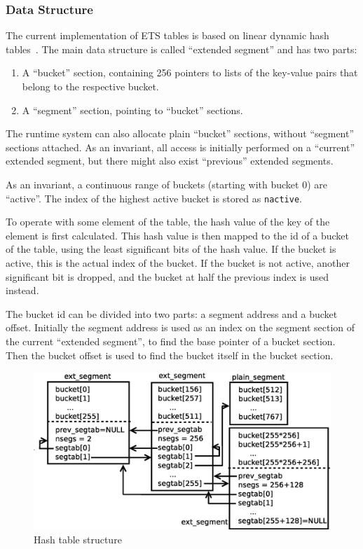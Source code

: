 \documentclass[aps,pre,preprint,nofootinbib]{revtex4}
\begin{document}
\subsubsection{Data Structure}

The current implementation of ETS tables is based on linear dynamic hash tables~\cite{Larson}.
The main data structure is called ``extended segment'' and has two parts:
\begin{enumerate}
  \item A ``bucket'' section, containing 256 pointers to lists of the key-value pairs that belong to the respective bucket.
  \item A ``segment'' section, pointing to ``bucket'' sections.
\end{enumerate}
The runtime system can also allocate plain ``bucket'' sections, without ``segment'' sections attached.
As an invariant, all access is initially performed on a ``current'' extended segment, but there might also exist ``previous'' extended segments.

As an invariant, a continuous range of buckets (starting with bucket 0) are ``active''.
The index of the highest active bucket is stored as \verb|nactive|.

To operate with some element of the table, the hash value of the key of the element is first calculated.
This hash value is then mapped to the id of a bucket of the table, using the least significant bits of the hash value.
If the bucket is active, this is the actual index of the bucket.
If the bucket is not active, another significant bit is dropped, and the bucket at half the previous index is used instead.

The bucket id can be divided into two parts: a segment address and a bucket offset.
Initially the segment address is used as an index on the segment section of the current ``extended segment'', to find the base pointer of a bucket section.
Then the bucket offset is used to find the bucket itself in the bucket section.

\begin{figure}[htb]
\centering
\includegraphics[width=1.0\textwidth]{hash_table_structure.eps}
\caption{Hash table structure} 
\label{fig:hash_table_structure}
\end{figure}
\end{document}
